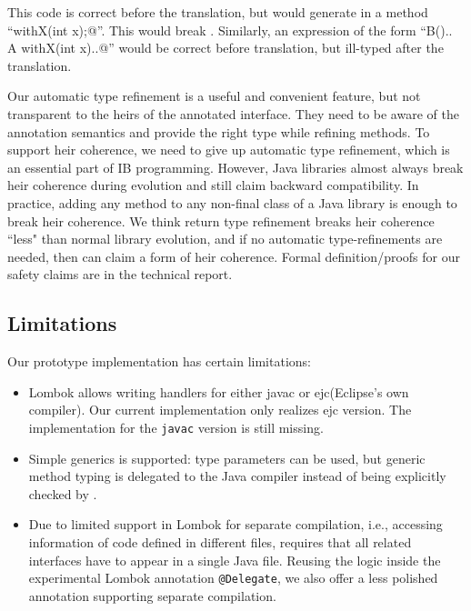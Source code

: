 \noindent This code is correct before the translation, but \mixin would  generate in \Q@B@  a method ``\Q@B withX(int x);@''.
This would break \Q@C@.
Similarly, an expression of the form ``\Q@new B(){.. A withX(int x){..}}@''
would be correct before translation, but ill-typed after the translation.

Our automatic type refinement is a useful and convenient feature, but
not transparent to the heirs of the annotated interface.  They need to
be aware of the annotation semantics and provide the right type while
refining methods. To support heir coherence, we need
to give up automatic type refinement, which is an essential part of IB programming.
However, Java libraries almost always break heir
coherence during evolution and still claim backward compatibility. In practice, adding any method to any
non-final class of a Java library is enough to break heir
coherence.  We think return type refinement breaks heir coherence ``less" than normal library evolution, and
if no automatic type-refinements are needed, then \mixin can claim a
form of heir coherence.
Formal definition/proofs for our safety claims are in the
technical report.%

\subsection{Limitations}
Our prototype implementation has certain limitations:
\begin{itemize}
\item Lombok allows writing handlers for either javac or ejc(Eclipse's own compiler).
Our current implementation only realizes ejc version. The implementation for
  the \texttt{javac} version is still missing.
\item Simple generics is supported:
type parameters can be used, but generic method typing is
delegated to the Java compiler instead of  %
being explicitly checked by \mixin.
\item
Due to limited support in Lombok for separate compilation, i.e.,
accessing information of code defined in different files, \mixin
requires that all
  related interfaces have to appear in a single Java file.
Reusing the logic inside the experimental Lombok annotation \lstinline{@Delegate},
we also offer a less polished annotation supporting
separate compilation.
\end{itemize}


